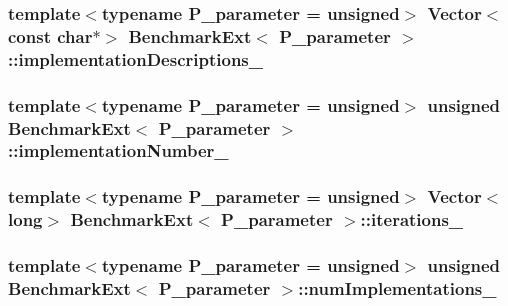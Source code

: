 \subsubsection[{implementation\+Descriptions\+\_\+}]{\setlength{\rightskip}{0pt plus 5cm}template$<$typename P\+\_\+parameter  = unsigned$>$ {\bf Vector}$<$const char$\ast$$>$ {\bf Benchmark\+Ext}$<$ P\+\_\+parameter $>$\+::implementation\+Descriptions\+\_\+\hspace{0.3cm}{\ttfamily [protected]}}\label{classBenchmarkExt_a0bf72f1aa5fb68ab91e6a361409d2b8e}
\hypertarget{classBenchmarkExt_a1d559c9a7dec5b5eb99896a45476a40d}{}
\subsubsection[{implementation\+Number\+\_\+}]{\setlength{\rightskip}{0pt plus 5cm}template$<$typename P\+\_\+parameter  = unsigned$>$ unsigned {\bf Benchmark\+Ext}$<$ P\+\_\+parameter $>$\+::implementation\+Number\+\_\+\hspace{0.3cm}{\ttfamily [protected]}}\label{classBenchmarkExt_a1d559c9a7dec5b5eb99896a45476a40d}
\hypertarget{classBenchmarkExt_abb305956ddfc7f52e081390eb630e8b6}{}
\subsubsection[{iterations\+\_\+}]{\setlength{\rightskip}{0pt plus 5cm}template$<$typename P\+\_\+parameter  = unsigned$>$ {\bf Vector}$<$long$>$ {\bf Benchmark\+Ext}$<$ P\+\_\+parameter $>$\+::iterations\+\_\+\hspace{0.3cm}{\ttfamily [protected]}}\label{classBenchmarkExt_abb305956ddfc7f52e081390eb630e8b6}
\hypertarget{classBenchmarkExt_a113bc04dbe3b34a0cac58d15e1c63ed6}{}
\subsubsection[{num\+Implementations\+\_\+}]{\setlength{\rightskip}{0pt plus 5cm}template$<$typename P\+\_\+parameter  = unsigned$>$ unsigned {\bf Benchmark\+Ext}$<$ P\+\_\+parameter $>$\+::num\+Implementations\+\_\+\hspace{0.3cm}{\ttfamily [protected]}}\label{classBenchmarkExt_a113bc04dbe3b34a0cac58d15e1c63ed6}
\hypertarget{classBenchmarkExt_aa8504a4be8de5aa135895c34efbb15c0}{}

